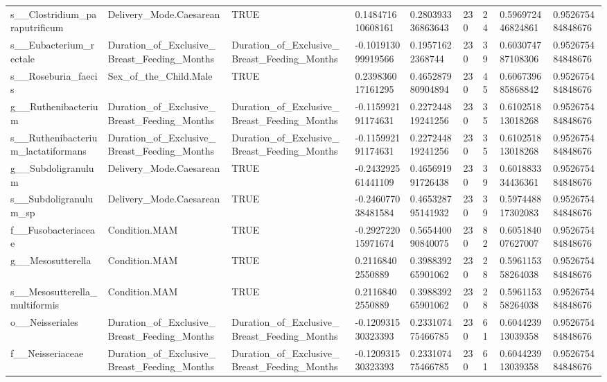 \begin{longtable}{lllllllll}
s\_\_Clostridium\_paraputrificum & Delivery\_Mode.Caesarean & TRUE & 0.148471610608161 & 0.280393336863643 & 230 & 24 & 0.596972446824861 & 0.952675484848676 \\
s\_\_Eubacterium\_rectale & Duration\_of\_Exclusive\_Breast\_Feeding\_Months & Duration\_of\_Exclusive\_Breast\_Feeding\_Months & -0.101913099919566 & 0.19571622368744 & 230 & 39 & 0.603074787108306 & 0.952675484848676 \\
s\_\_Roseburia\_faecis & Sex\_of\_the\_Child.Male & TRUE & 0.239836017161295 & 0.465287980904894 & 230 & 45 & 0.606739685868842 & 0.952675484848676 \\
g\_\_Ruthenibacterium & Duration\_of\_Exclusive\_Breast\_Feeding\_Months & Duration\_of\_Exclusive\_Breast\_Feeding\_Months & -0.115992191174631 & 0.227244819241256 & 230 & 35 & 0.610251813018268 & 0.952675484848676 \\
s\_\_Ruthenibacterium\_lactatiformans & Duration\_of\_Exclusive\_Breast\_Feeding\_Months & Duration\_of\_Exclusive\_Breast\_Feeding\_Months & -0.115992191174631 & 0.227244819241256 & 230 & 35 & 0.610251813018268 & 0.952675484848676 \\
g\_\_Subdoligranulum & Delivery\_Mode.Caesarean & TRUE & -0.243292561441109 & 0.465691991726438 & 230 & 39 & 0.601883334436361 & 0.952675484848676 \\
s\_\_Subdoligranulum\_sp & Delivery\_Mode.Caesarean & TRUE & -0.246077038481584 & 0.465328795141932 & 230 & 39 & 0.597448817302083 & 0.952675484848676 \\
f\_\_Fusobacteriaceae & Condition.MAM & TRUE & -0.292722015971674 & 0.565440090840075 & 230 & 82 & 0.605184007627007 & 0.952675484848676 \\
g\_\_Mesosutterella & Condition.MAM & TRUE & 0.21168402550889 & 0.398839265901062 & 230 & 28 & 0.596115358264038 & 0.952675484848676 \\
s\_\_Mesosutterella\_multiformis & Condition.MAM & TRUE & 0.21168402550889 & 0.398839265901062 & 230 & 28 & 0.596115358264038 & 0.952675484848676 \\
o\_\_Neisseriales & Duration\_of\_Exclusive\_Breast\_Feeding\_Months & Duration\_of\_Exclusive\_Breast\_Feeding\_Months & -0.120931530323393 & 0.233107475466785 & 230 & 61 & 0.604423913039358 & 0.952675484848676 \\
f\_\_Neisseriaceae & Duration\_of\_Exclusive\_Breast\_Feeding\_Months & Duration\_of\_Exclusive\_Breast\_Feeding\_Months & -0.120931530323393 & 0.233107475466785 & 230 & 61 & 0.604423913039358 & 0.952675484848676 \\

\end{longtable}
